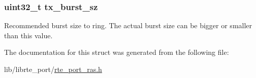 \subsubsection[{tx\+\_\+burst\+\_\+sz}]{\setlength{\rightskip}{0pt plus 5cm}uint32\+\_\+t tx\+\_\+burst\+\_\+sz}\label{structrte__port__ring__writer__ipv4__ras__params_a9ed7dbe6241b97c9b68a9491e77c84d0}
Recommended burst size to ring. The actual burst size can be bigger or smaller than this value. 

The documentation for this struct was generated from the following file\+:\begin{DoxyCompactItemize}
\item 
lib/librte\+\_\+port/\hyperlink{rte__port__ras_8h}{rte\+\_\+port\+\_\+ras.\+h}\end{DoxyCompactItemize}
